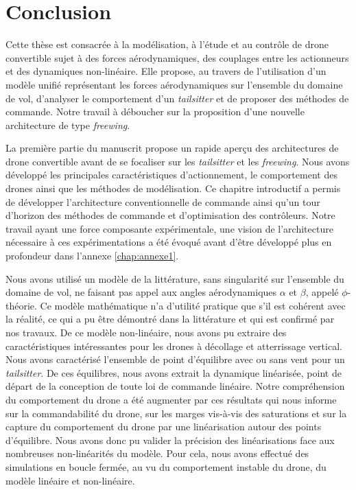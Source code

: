 \chapter*{Conclusion}

{ \color{red}

Cette thèse est consacrée à la modélisation, à l'étude et au contrôle de drone convertible sujet à des forces aérodynamiques, des couplages entre les actionneurs et des dynamiques non-linéaire. Elle propose, au travers de l'utilisation d'un modèle unifié représentant les forces aérodynamiques sur l'ensemble du domaine de vol, d'analyser le comportement d'un \textit{tailsitter} et de proposer des méthodes de commande. Notre travail à déboucher sur la proposition d'une nouvelle architecture de type \textit{freewing}.

La première partie du manuscrit propose un rapide aperçu des architectures de drone convertible avant de se focaliser sur les \textit{tailsitter} et les \textit{freewing}. Nous avons développé les principales caractéristiques d'actionnement, le comportement des drones ainsi que les méthodes de modélisation. Ce chapitre introductif a permis de développer l'architecture conventionnelle de commande ainsi qu'un tour d'horizon des méthodes de commande et d'optimisation des contrôleurs. Notre travail ayant une force composante expérimentale, une vision de l'architecture nécessaire à ces expérimentations a été évoqué avant d'être développé plus en profondeur dans l'annexe \ref{chap:annexe1}.  

Nous avons utilisé un modèle de la littérature, sans singularité sur l'ensemble du domaine de vol, ne faisant pas appel aux angles aérodynamiques $\alpha$ et $\beta$, appelé $\phi$-théorie. Ce modèle mathématique n'a d'utilité pratique que s'il est cohérent avec la réalité, ce qui a pu être démontré dans la littérature et qui est confirmé par nos travaux. De ce modèle non-linéaire, nous avons pu extraire des caractéristiques intéressantes pour les drones à décollage et atterrissage vertical. 
Nous avons caractérisé l'ensemble de point d'équilibre avec ou sans vent pour un \textit{tailsitter}. De ces équilibres, nous avons extrait la dynamique linéarisée, point de départ de la conception de toute loi de commande linéaire. Notre compréhension du comportement du drone a été augmenter par ces résultats qui nous informe sur la commandabilité du drone, sur les marges vis-à-vis des saturations et sur la capture du comportement du drone par une linéarisation autour des points d'équilibre. Nous avons donc pu valider la précision des linéarisations face aux nombreuses non-linéarités du modèle. Pour cela, nous avons effectué des simulations en boucle fermée, au vu du comportement instable du drone, du modèle linéaire et non-linéaire.

}
